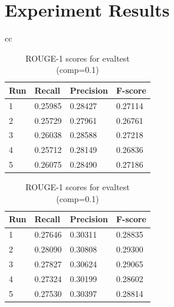 \documentclass[11pt]{article}
\begin{document}
\appendix

\section{Experiment Results}

\begin{table}[!ht]
\begin{tabular}{cc}
\begin{minipage}{1.05\linewidth}
\centering
\caption*{ROUGE-1 scores for devtest (comp=0.1)}
\begin{tabular}{|l|l|l|l|}
\hline
Run   & Recall  & Precision & F-score \\ \hline
1 & 0.25985 & 0.28427   & 0.27114 \\ \hline
2 & 0.25729 & 0.27961   & 0.26761 \\ \hline
3 & 0.26038 & 0.28588   & 0.27218 \\ \hline
4 & 0.25712 & 0.28149   & 0.26836 \\ \hline
5 & 0.26075 & 0.28490   & 0.27186 \\ \hline
\end{tabular}
\end{minipage} 

\begin{minipage}{1.05\linewidth}
\centering
\caption*{ROUGE-1 scores for evaltest (comp=0.1)}
\begin{tabular}{|l|l|l|l|}
\hline
Run   & Recall  & Precision & F-score \\ \hline
1 & 0.27646 & 0.30311   & 0.28835 \\ \hline
2 & 0.28090 & 0.30808   & 0.29300 \\ \hline
3 & 0.27827 & 0.30624   & 0.29065 \\ \hline
4 & 0.27324 & 0.30199   & 0.28602 \\ \hline
5 & 0.27530 & 0.30397   & 0.28814 \\ \hline
\end{tabular}
\end{minipage}
\end{tabular}
\end{table}
\end{document}
